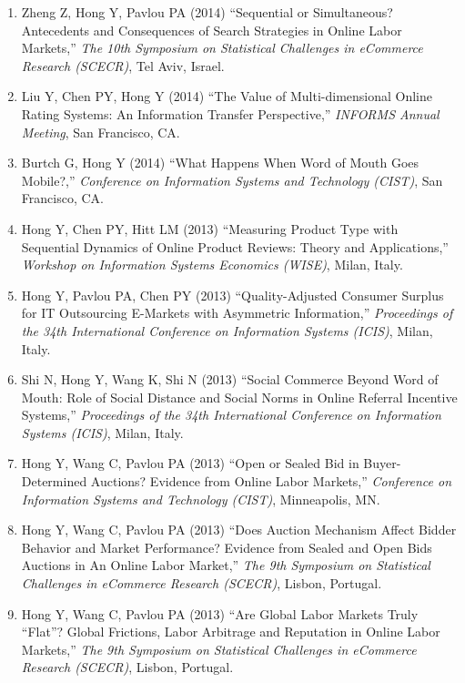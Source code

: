 \documentclass[paper=letter,fontsize=10pt]{scrartcl} %
\newcommand{\ConfEntry}[6]{
		\noindent #1 (#2) ``#3,'' \textit{#4}, #5. \textcolor{blue}{#6}}
\newcommand{\Hong}{Hong Y}
\begin{document}
\begin{enumerate}
\item \ConfEntry{Zheng Z, \Hong, Pavlou PA}{2014}{Sequential or Simultaneous? Antecedents and Consequences of Search Strategies in Online Labor Markets}{The 10th Symposium on Statistical Challenges in eCommerce Research (SCECR)}{Tel Aviv, Israel}{}

\item \ConfEntry{Liu Y, Chen PY, \Hong}{2014}{The Value of Multi-dimensional Online Rating Systems: An Information Transfer Perspective}{INFORMS Annual Meeting}{San Francisco, CA}{}

\item \ConfEntry{Burtch G, \Hong}{2014}{What Happens When Word of Mouth Goes Mobile?}{Conference on Information Systems and Technology (CIST)}{San Francisco, CA}{}

\item \ConfEntry{\Hong, Chen PY, Hitt LM}{2013}{Measuring Product Type with Sequential Dynamics of Online Product Reviews: Theory and Applications}{Workshop on Information Systems Economics (WISE)}{Milan, Italy}{}

\item \ConfEntry{\Hong, Pavlou PA, Chen PY}{2013}{Quality-Adjusted Consumer Surplus for IT Outsourcing E-Markets with Asymmetric Information}{Proceedings of the 34th International Conference on Information Systems (ICIS)}{Milan, Italy}{}

\item \ConfEntry{Shi N, \Hong, Wang K, Shi N}{2013}{Social Commerce Beyond Word of Mouth: Role of Social Distance and Social Norms in Online Referral Incentive Systems}{Proceedings of the 34th International Conference on Information Systems (ICIS)}{Milan, Italy}{}

\item \ConfEntry{\Hong, Wang C, Pavlou PA}{2013}{Open or Sealed Bid in Buyer-Determined Auctions? Evidence from Online Labor Markets}{Conference on Information Systems and Technology (CIST)}{Minneapolis, MN}{}

\item \ConfEntry{\Hong, Wang C, Pavlou PA}{2013}{Does Auction Mechanism Affect Bidder Behavior and Market Performance? Evidence from Sealed and Open Bids Auctions in An Online Labor Market}{The 9th Symposium on Statistical Challenges in eCommerce Research (SCECR)}{Lisbon, Portugal}{}

\item \ConfEntry{\Hong, Wang C, Pavlou PA}{2013}{Are Global Labor Markets Truly ``Flat''? Global Frictions, Labor Arbitrage and Reputation in Online Labor Markets}{The 9th Symposium on Statistical Challenges in eCommerce Research (SCECR)}{Lisbon, Portugal}{}


\end{enumerate}
\end{document}
